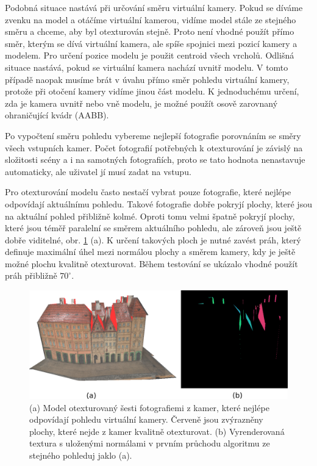 \documentclass[11pt,twoside,a4paper]{book}
\begin{document}
Podobná situace nastává při určování směru virtuální kamery.  Pokud se díváme zvenku na model a otáčíme virtuální kamerou, vidíme model stále ze stejného směru a chceme, aby byl otexturován stejně. Proto není vhodné použít přímo směr, kterým se dívá virtuální kamera, ale spíše spojnici mezi pozicí kamery a modelem. Pro určení pozice modelu je použit centroid všech vrcholů. Odlišná situace nastává, pokud se virtuální kamera nachází uvnitř modelu. V tomto případě naopak musíme brát v úvahu přímo směr pohledu virtuální kamery, protože při otočení kamery vidíme jinou část modelu. K jednoduchému určení, zda je kamera uvnitř nebo vně modelu, je možné použít osově zarovnaný ohraničující kvádr (AABB).


Po vypočtení směru pohledu vybereme nejlepší fotografie porovnáním se směry všech vstupních kamer. Počet fotografií potřebných k otexturování je závislý na složitosti scény a i na samotných fotografiích, proto se tato hodnota nenastavuje automaticky, ale uživatel jí musí zadat na vstupu.

Pro otexturování modelu často nestačí vybrat pouze fotografie, které nejlépe odpovídají aktuálnímu pohledu. Takové fotografie dobře pokryjí plochy, které jsou na aktuální pohled přibližně kolmé. Oproti tomu velmi špatně pokryjí plochy, které jsou téměř paralelní se směrem aktuálního pohledu, ale zároveň jsou ještě dobře viditelné, obr. \ref{fig:faces-no-tex} (a). K určení takových ploch je nutné zavést práh, který definuje maximální úhel mezi normálou plochy a směrem kamery, kdy je ještě možné plochu kvalitně otexturovat. Během testování se ukázalo vhodné použít práh přibližně $70^{\circ}$. 


\begin{figure}[th]
\begin{center}
\includegraphics[width=\textwidth]{figures/faces-no-tex}
\caption{(a) Model otexturovaný šesti fotografiemi z kamer, které nejlépe odpovídají pohledu virtuální kamery. Červeně jsou zvýrazněny plochy, které nejde z kamer kvalitně otexturovat. (b) Vyrenderovaná textura s uloženými normálami v prvním průchodu algoritmu ze stejného pohleduj jaklo (a).}
\label{fig:faces-no-tex}
\end{center}
\end{figure}
\end{document}
